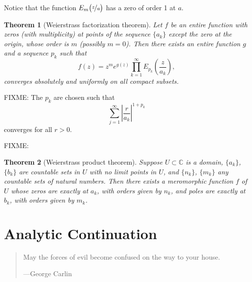 \documentclass[12pt,openany]{book}
\newcommand{\abs}[1]{\left\lvert {#1} \right\rvert}
\newcommand{\C}{{\mathbb{C}}}
\theoremstyle{plain}
\newtheorem{thm}{Theorem}[section]
\theoremstyle{remark}
\theoremstyle{definition}
\newenvironment{myquote}{%
    \begin{quote}%
    \begingroup\itshape
}{%
    \endgroup%
    \end{quote}
}
\theoremstyle{exercise}
\theoremstyle{example}
\begin{document}
Notice that the function $E_m\bigl(\nicefrac{z}{a}\bigr)$ has a zero of order 1 at $a$.

\begin{thm}[Weierstrass factorization theorem]
Let $f$ be an entire function with zeros (with multiplicity) at points of
the sequence $\{ a_k \}$ except the zero at
the origin, whose order is $m$ (possibly $m=0$).  Then there exists an
entire function $g$ and a sequence $p_k$ such that
\begin{equation*}
f(z) = z^m e^{g(z)} \prod_{k=1}^\infty E_{p_k}\left(\frac{z}{a_k}\right) ,
\end{equation*}
converges absolutely and uniformly on all compact subsets.
\end{thm}

FIXME: The $p_k$ are chosen such that
\begin{equation*}
\sum_{j=1}^\infty {\abs{\frac{r}{a_k}}}^{1+p_k}
\end{equation*}
converges for all $r > 0$.

FIXME:

\begin{thm}[Weierstrass product theorem]
Suppose $U \subset \C$ is a domain, $\{ a_k \}$, $\{ b_k \}$ are
countable sets in $U$
with no limit points in $U$, and $\{ n_k \}$, $\{ m_k \}$ any countable sets of
natural numbers.
Then there exists a meromorphic function $f$ of $U$ whose
zeros are exactly at $a_k$, with orders given by $n_k$, and
poles are exactly at $b_k$, with orders given by $m_k$.
\end{thm}


\chapter{Analytic Continuation} \label{ch:analcont}

\begin{myquote}
May the forces of evil become confused on the way to your house.

---George Carlin
\end{myquote}

\end{document}
